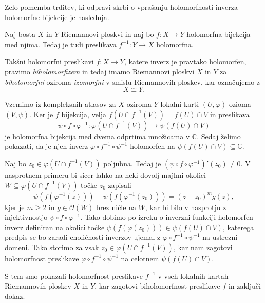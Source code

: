 \documentclass[mat1]{fmfdelo}
\newcommand{\C}{\mathbb C}
\newcommand{\inv}{^{-1}}
\newcommand{\hol}[1]{\mathcal{O}(#1)}
\theoremstyle{definition}
\begin{document}
Zelo pomemba trditev, ki odpravi skrbi o vprašanju holomorfnosti inverza holomorfne bijekcije je naslednja. 

\begin{trditev}
    \label{holomorfna bijekcija je biholomorfizem}
    Naj bosta $X$ in $Y$ Riemannovi ploskvi in naj bo $f: X \to Y$ holomorfna bijekcija med njima. Tedaj je tudi preslikava $f\inv : Y \to X$ holomorfna.
\end{trditev}

\begin{opomba}
    Takšni holomorfni preslikavi $f : X \to Y$, katere inverz je pravtako holomorfen, pravimo \emph{biholomorfizem} in tedaj imamo Riemannovi ploskvi $X$ in $Y$ za \emph{biholomorfni} oziroma \emph{izomorfni} v smislu Riemannovih ploskev, kar označujemo z 
    \[
        X \cong Y.
    \]
\end{opomba}

\begin{dokaz}
    Vzemimo iz kompleksnih atlasov za $X$ oziroma $Y$ lokalni karti $(U, \varphi)$ ozioma $(V, \psi)$.
    Ker je $f$ bijekcija, velja $f(U \cap f\inv(V)) = f(U) \cap V$ in preslikava 
    \[
        \psi \circ f \circ \varphi\inv : \varphi(U \cap f\inv(V)) \to \psi(f(U) \cap V)  
    \]
    je holomorfna bijekcija med dvema odprtima množicama v $\C$. Sedaj želimo pokazati, da je njen inverz $\varphi \circ f\inv \circ \psi\inv$ holomorfen na $\psi(f(U) \cap V) \subseteq \C$.

    Naj bo $z_0 \in \varphi(U \cap f\inv(V))$ poljubna. Tedaj je $(\psi \circ f \circ \varphi\inv)'(z_0) \neq 0$. V nasprotnem primeru bi sicer lahko na neki dovolj majhni okolici $W \subseteq \varphi(U \cap f\inv(V))$ točke $z_0$ zapisali 
    \[
        \psi(f(\varphi\inv(z))) - \psi(f(\varphi\inv(z_0))) = (z - z_0)^m g(z),
    \]
    kjer je $m \geq 2$ in $g \in \hol{W}$ brez ničle na $W$, %
    kar bi bilo v nasprotju z injektivnostjo $\psi \circ f \circ \varphi\inv$. Tako dobimo po izreku o inverzni funkciji \cite[Izrek 67]{Globevnik} holomorfen inverz definiran na okolici točke $\psi(f(\varphi(z_0))) \in \psi(f(U) \cap V)$, katerega predpis se bo zaradi enoličnosti inverzov ujemal z $\varphi \circ f\inv \circ \psi\inv$ na ustrezni domeni. Tako storimo za vsak $z_0 \in \varphi(U \cap f\inv(V))$, kar nam zagotovi holomorfnost preslikave $\varphi \circ f\inv \circ \psi\inv$ %
    na celotnem $\psi(f(U) \cap V)$. 
    
    S tem smo pokazali holomorfnost preslikave $f\inv$ v vseh lokalnih kartah Riemannovih ploskev $X$ in $Y$, kar zagotovi biholomorfnost preslikave $f$ in zaključi dokaz. 
\end{dokaz}
\end{document}
